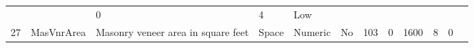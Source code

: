 \documentclass[11pt]{article}
\begin{document}
\begin{longtable}[]{@{}llllllllllll@{}}
\begin{minipage}[t]{0.04\columnwidth}
\strut
\end{minipage} & \begin{minipage}[t]{0.04\columnwidth}\raggedright\strut
\strut
\end{minipage} & \begin{minipage}[t]{0.04\columnwidth}\raggedright\strut
0\strut
\end{minipage} & \begin{minipage}[t]{0.04\columnwidth}\raggedright\strut
4\strut
\end{minipage} & \begin{minipage}[t]{0.04\columnwidth}\raggedright\strut
Low\strut
\end{minipage}\tabularnewline
\begin{minipage}[t]{0.04\columnwidth}\raggedright\strut
27\strut
\end{minipage} & \begin{minipage}[t]{0.04\columnwidth}\raggedright\strut
MasVnrArea\strut
\end{minipage} & \begin{minipage}[t]{0.04\columnwidth}\raggedright\strut
Masonry veneer area in square feet\strut
\end{minipage} & \begin{minipage}[t]{0.04\columnwidth}\raggedright\strut
Space\strut
\end{minipage} & \begin{minipage}[t]{0.04\columnwidth}\raggedright\strut
Numeric\strut
\end{minipage} & \begin{minipage}[t]{0.04\columnwidth}\raggedright\strut
No\strut
\end{minipage} & \begin{minipage}[t]{0.04\columnwidth}\raggedright\strut
103\strut
\end{minipage} & \begin{minipage}[t]{0.04\columnwidth}\raggedright\strut
0\strut
\end{minipage} & \begin{minipage}[t]{0.04\columnwidth}\raggedright\strut
1600\strut
\end{minipage} & \begin{minipage}[t]{0.04\columnwidth}\raggedright\strut
8\strut
\end{minipage} & \begin{minipage}[t]{0.04\columnwidth}\raggedright\strut
0\strut
\end{minipage} & \begin{minipage}[t]{0.04\columnwidth}\raggedright\strut

\end{minipage}
\end{longtable}
\end{document}
